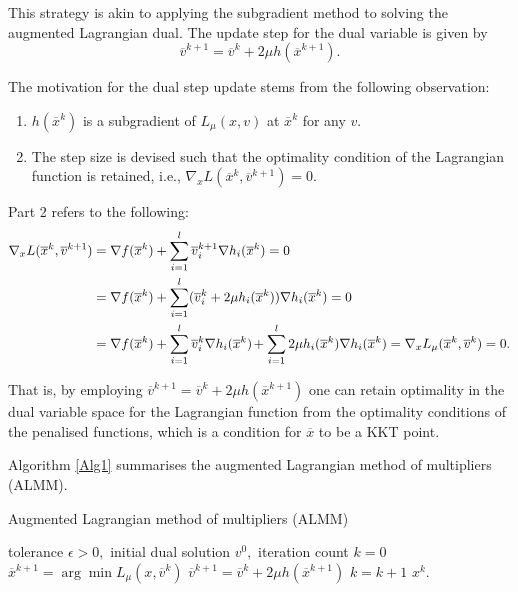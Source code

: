 This strategy is akin to applying the subgradient method to solving the augmented Lagrangian dual. The update step for the dual variable is given by 
$$
\overline{v}^{k+1} = \overline{v}^k + 2\mu h(\overline{x}^{k+1}). 
$$

The motivation for the dual step update stems from the following observation:
%
\begin{enumerate}
\item $h(\overline{x}^k)$ is a subgradient of $L_\mu(x,v)$ at $\overline{x}^k$ for any $v$.
\item The step size is devised such that the optimality condition of the Lagrangian function is retained, i.e., $\nabla_x L(\overline{x}^k,\overline{v}^{k+1}) = 0$.
\end{enumerate}

Part 2 refers to the following:
%
\begin{align*}
\nabla_x L(\overline{x}^k,\overline{v}^{k+1}) & =  \nabla f(\overline{x}^k) + \sum_{i=1}^l\overline{v}^{k+1}_i\nabla h_i(\overline{x}^k) = 0 \\
& = \nabla f(\overline{x}^k)  + \sum_{i=1}^l(\overline{v}_i^{k} + 2\mu h_i(\overline{x}^k))\nabla h_i(\overline{x}^k) = 0 \\
& = \nabla f(\overline{x}^k) + \sum_{i=1}^l\overline{v}_i^{k}\nabla h_i(\overline{x}^k)\hspace{-1pt} + \sum_{i=1}^l2\mu h_i(\overline{x}^k)\nabla h_i(\overline{x}^k) = \nabla_x L_\mu(\overline{x}^k,\overline{v}^{k})=0.
\end{align*}

That is, by employing $\overline{v}^{k+1} = \overline{v}^k + 2\mu h(\overline{x}^{k+1})$ one can retain optimality in the dual variable space for the Lagrangian function from the optimality conditions of the penalised functions, which is a condition for $\overline{x}$ to be a KKT point. 

Algorithm \ref{Alg1} summarises the augmented Lagrangian method of multipliers (ALMM). 

\begin{algorithm}[H]
\caption{Augmented Lagrangian method of multipliers (ALMM)} \label{Alg1}
\begin{algorithmic}[1] %
 tolerance $\epsilon > 0,$ initial dual solution $v^0,$ iteration count $k = 0$  
        \State $\overline{x}^{k+1} = \arg\min L_\mu(x,\overline{v}^k)$
        \State $\overline{v}^{k+1} = \overline{v}^{k} + 2\mu h(\overline{x}^{k+1})$
    \State $k = k+1$
\EndWhile
{} $x^k$.
\end{algorithmic}
\end{algorithm}


